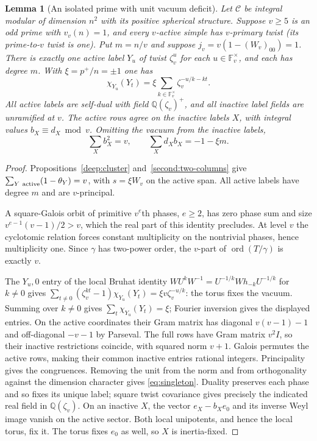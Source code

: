 \documentclass[11pt,a4paper]{article}
\numberwithin{equation}{section}
\newtheorem{lemma}[theorem]{Lemma}
\theoremstyle{remark}
\newcommand{\C}{\mathcal C}
\newcommand{\QQ}{\mathbb Q}
\DeclareMathOperator{\ord}{ord}
\begin{document}
\begin{lemma}[An isolated prime with unit vacuum deficit]\label{fam:M:6.4}\label{lem:singleton}
Let $\C$ be integral modular of dimension $n^2$ with its positive
spherical structure. Suppose $v\ge5$ is
an odd prime with $v_v(n)=1$, and every $v$-active simple has
$v$-primary twist (its prime-to-$v$ twist is one).
Put $m=n/v$ and suppose $j_v=v(1-(W_v)_{00})=1$.
There is exactly one active label $Y_u$ of twist $\zeta_v^u$
for each $u\in\mathbb F_v^\times$, and each has degree $m$.
With $\xi=p^+/n=\pm1$ one has
\[
 \chi_{Y_u}(Y_t)=\xi\sum_{k\in\mathbb F_v^\times}
                              \zeta_v^{-u/k-kt}.
\]
All active labels are self-dual with field $\QQ(\zeta_v)^+$, and all inactive label fields are unramified at $v$.
The active rows agree on the inactive labels $X$, with integral values
$b_X\equiv d_X\bmod v$. Omitting the vacuum from the inactive labels,
\begin{equation}\label{eq:singleton}
                 \sum_X b_X^2=v,\qquad
                 \sum_X d_Xb_X=-1-\xi m .
\end{equation}
\end{lemma}
\begin{proof}
Propositions~\ref{deep:cluster} and~\ref{second:two-columns} give
$\sum_{Y\ {\rm active}}(1-\theta_Y)=v$, with $s=\xi W_v$ on the
active span. All active labels have degree $m$ and are $v$-principal.

A square-Galois orbit of primitive $v^e$th phases, $e\ge2$, has zero
phase sum and size $v^{e-1}(v-1)/2>v$, which the real part of this
identity precludes. At level $v$ the cyclotomic relation forces
constant multiplicity on the nontrivial phases, hence multiplicity one. Since $\gamma$ has two-power order, the $v$-part of $\ord(T/\gamma)$ is exactly $v$.

The $Y_u,0$ entry of the local Bruhat identity
$WU^kW^{-1}=U^{-1/k}Wh_{-k}U^{-1/k}$ for $k\ne0$ gives
$\sum_{t\ne0}(\zeta_v^{kt}-1)\chi_{Y_u}(Y_t)=\xi v\zeta_v^{-u/k}$:
the torus fixes the vacuum. Summing over $k\ne0$ gives
$\sum_t\chi_{Y_u}(Y_t)=\xi$; Fourier inversion gives the displayed
entries. On the active coordinates their Gram matrix has diagonal
$v(v-1)-1$ and off-diagonal $-v-1$ by Parseval. The full rows have
Gram matrix $v^2I$, so their inactive restrictions coincide, with
squared norm $v+1$. Galois permutes the active rows, making their
common inactive entries rational integers. Principality gives the
congruences. Removing the unit from the norm and from orthogonality
against the dimension character gives \eqref{eq:singleton}.
Duality preserves each phase and so fixes its unique label; square
twist covariance gives precisely the indicated real field in
$\QQ(\zeta_v)$. On an inactive $X$, the vector $e_X-b_X e_0$ and
its inverse Weyl image vanish on the active sector. Both local
unipotents, and hence the local torus, fix it. The torus fixes
$e_0$ as well, so $X$ is inertia-fixed.
\end{proof}
\end{document}
